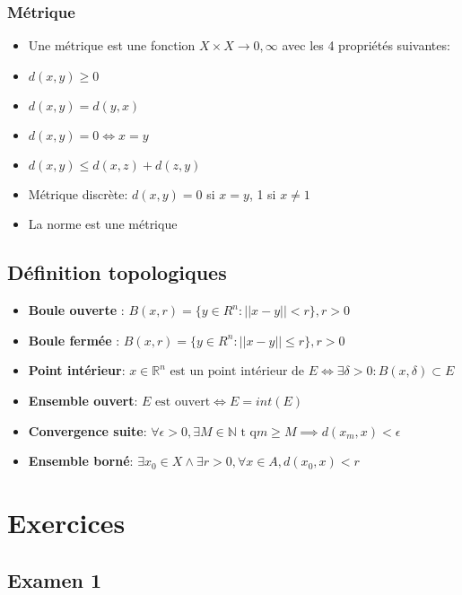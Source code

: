 \documentclass[12pt]{book}
\let\Bbb\mathbb
\theoremstyle{definition}
\begin{document}
\subsection{Métrique}
\begin{itemize}
    \item Une métrique est une fonction $X \times X \to 0, \infty$ avec les 4 propriétés suivantes:
    \item $d(x,y) \geq 0$
    \item $d(x,y) = d(y, x)$
    \item $d(x,y) = 0 \iff x = y$
    \item $d(x,y) \leq d(x, z) + d(z, y)$
    \item Métrique discrète: $d(x,y) = 0$ si $x = y$, 1 si $x \neq 1$
    \item La norme est une métrique
\end{itemize}
\section{Définition topologiques}
\begin{itemize}
    \item \textbf{Boule ouverte} : $B(x, r) = \{y \in R^n : || x - y || < r\}, r > 0$
    \item \textbf{Boule fermée} : $B(x, r) = \{y \in R^n : || x - y || \leq r\}, r > 0$
    \item \textbf{Point intérieur}: $x \in \Bbb R^n \text{ est un point intérieur de } E \iff \exists \delta > 0 : B(x, \delta) \subset E$
    \item \textbf{Ensemble ouvert}: $E\text{ est ouvert} \iff E = int(E)$
    \item \textbf{Convergence suite}: $\forall \epsilon > 0, \exists M \in \Bbb N \text{ t q} m \geq M \implies d(x_m, x) < \epsilon$
    \item \textbf{Ensemble borné}: $\exists x_0 \in X \land \exists r > 0, \forall x \in A, d(x_0, x) < r$
\end{itemize}

\chapter{Exercices}
\section{Examen 1}
\end{document}
